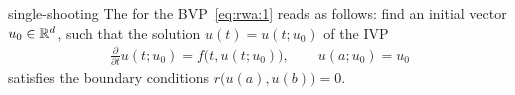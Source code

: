 \begin{Definition}{single-shooting}
  The 
  for the BVP~\eqref{eq:rwa:1} reads as follows: find an
  initial vector $u_0\in \mathbb R^d$, such that the solution $u(t) = u(t;u_0)$ of the IVP
  \begin{gather*}
    \tfrac\partial{\partial t} u(t;u_0) =f\bigl(t,u(t;u_0)\bigr), \qquad u(a;u_0) = u_0 
  \end{gather*}
  satisfies the boundary conditions $r\bigl(u(a),u(b)\bigr)=0$.
\end{Definition}


